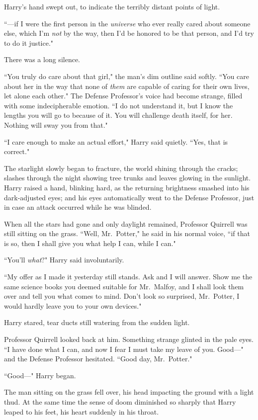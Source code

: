 Harry's hand swept out, to indicate the terribly distant points of light.

``---if I were the first person in the \emph{universe} who ever really cared about someone else, which I'm \emph{not} by the way, then I'd be honored to be that person, and I'd try to do it justice."

There was a long silence.

``You truly do care about that girl," the man's dim outline said softly. ``You care about her in the way that none of \emph{them} are capable of caring for their own lives, let alone each other." The Defense Professor's voice had become strange, filled with some indecipherable emotion. ``I do not understand it, but I know the lengths you will go to because of it. You will challenge death itself, for her. Nothing will sway you from that."

``I care enough to make an actual effort," Harry said quietly. ``Yes, that is correct."

The starlight slowly began to fracture, the world shining through the cracks; slashes through the night showing tree trunks and leaves glowing in the sunlight. Harry raised a hand, blinking hard, as the returning brightness smashed into his dark-adjusted eyes; and his eyes automatically went to the Defense Professor, just in case an attack occurred while he was blinded.

When all the stars had gone and only daylight remained, Professor Quirrell was still sitting on the grass. ``Well, Mr.~Potter," he said in his normal voice, ``if that is so, then I shall give you what help I can, while I can."

``You'll \emph{what}?" Harry said involuntarily.

``My offer as I made it yesterday still stands. Ask and I will answer. Show me the same science books you deemed suitable for Mr.~Malfoy, and I shall look them over and tell you what comes to mind. Don't look so surprised, Mr.~Potter, I would hardly leave you to your own devices."

Harry stared, tear ducts still watering from the sudden light.

Professor Quirrell looked back at him. Something strange glinted in the pale eyes. ``I have done what I can, and now I fear I must take my leave of you. Good---" and the Defense Professor hesitated. ``Good day, Mr.~Potter."

``Good---" Harry began.

The man sitting on the grass fell over, his head impacting the ground with a light thud. At the same time the sense of doom diminished so sharply that Harry leaped to his feet, his heart suddenly in his throat.

